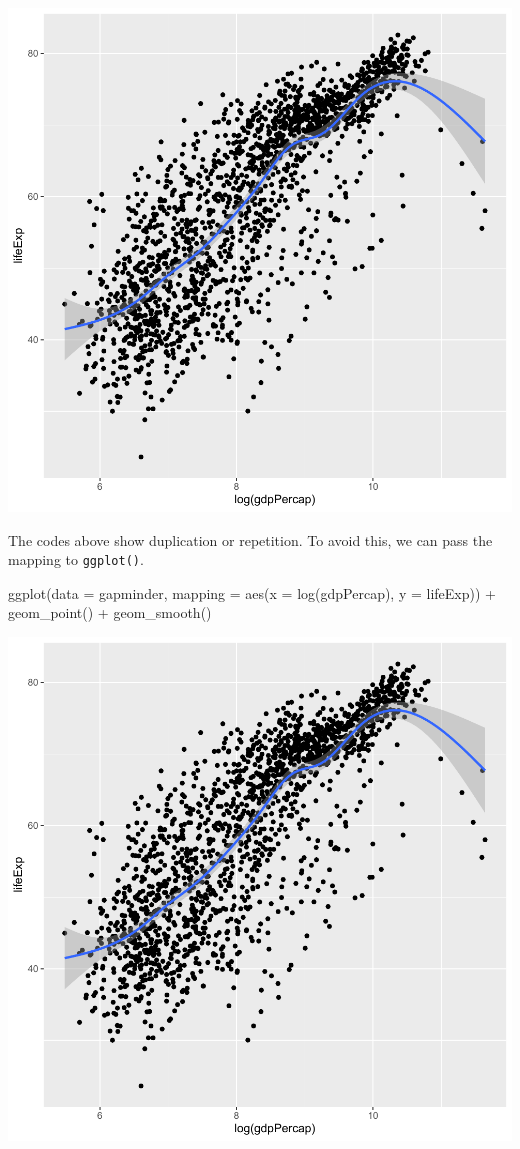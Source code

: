 \documentclass[
]{book}
\makeatletter
\newenvironment{Shaded}{\begin{snugshade}}{\end{snugshade}}
\newcommand{\AttributeTok}[1]{\textcolor[rgb]{0.61,0.61,0.61}{#1}}
\newcommand{\FunctionTok}[1]{\textcolor[rgb]{0,0,0}{#1}}
\newcommand{\NormalTok}[1]{#1}
\newcommand{\SpecialCharTok}[1]{\textcolor[rgb]{0,0,0}{#1}}
\newenvironment{kframe}{%
\medskip{}
\setlength{\fboxsep}{.8em}
 \def\at@end@of@kframe{}%
 \ifinner\ifhmode%
  \def\at@end@of@kframe{\end{minipage}}%
  \begin{minipage}{\columnwidth}%
 \fi\fi%
 \def\FrameCommand##1{\hskip\@totalleftmargin \hskip-\fboxsep
 \colorbox{shadecolor}{##1}\hskip-\fboxsep
     \hskip-\linewidth \hskip-\@totalleftmargin \hskip\columnwidth}%
 \MakeFramed {\advance\hsize-\width
   \@totalleftmargin\z@ \linewidth\hsize
   \@setminipage}}%
 {\par\unskip\endMakeFramed%
 \at@end@of@kframe}
\renewenvironment{Shaded}{\begin{kframe}}{\end{kframe}}
\makeatother
\begin{document}
\begin{center}\includegraphics[width=0.7\linewidth,keepaspectratio]{Multivariable_Data_Analysis_files/figure-latex/unnamed-chunk-29-1} \end{center}

The codes above show duplication or repetition. To avoid this, we can pass the mapping to \texttt{ggplot()}.

\begin{Shaded}
\begin{Highlighting}[]
\FunctionTok{ggplot}\NormalTok{(}\AttributeTok{data =}\NormalTok{ gapminder, }\AttributeTok{mapping =} \FunctionTok{aes}\NormalTok{(}\AttributeTok{x =} \FunctionTok{log}\NormalTok{(gdpPercap), }\AttributeTok{y =}\NormalTok{ lifeExp)) }\SpecialCharTok{+}
  \FunctionTok{geom\_point}\NormalTok{() }\SpecialCharTok{+}
  \FunctionTok{geom\_smooth}\NormalTok{()}
\end{Highlighting}
\end{Shaded}

\begin{center}\includegraphics[width=0.7\linewidth,keepaspectratio]{Multivariable_Data_Analysis_files/figure-latex/unnamed-chunk-30-1} \end{center}
\end{document}
